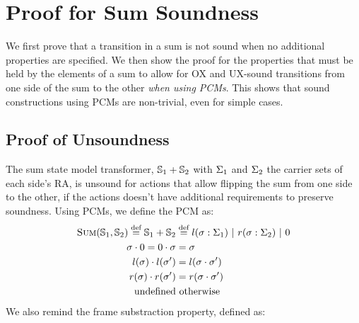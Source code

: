 \chapter{Proof for Sum Soundness} \label{ap:sum-soundness}

We first prove that a transition in a sum is not sound when no additional properties are specified. We then show the proof for the properties that must be held by the elements of a sum to allow for OX and UX-sound transitions from one side of the sum to the other \emph{when using PCMs}. This shows that sound constructions using PCMs are non-trivial, even for simple cases.

\section{Proof of Unsoundness}

The sum state model transformer, $\mathbb S_1 + \mathbb S_2$ with $\Sigma_1$ and $\Sigma_2$ the carrier sets of each side's RA, is unsound for actions that allow flipping the sum from one side to the other, if the actions doesn't have additional requirements to preserve soundness. Using PCMs, we define the \Sum{} PCM as: \begin{align*}
	\textsc{Sum}(\mathbb S_1, \mathbb S_2) \stackrel{\textnormal{def}}= \mathbb S_1 + \mathbb S_2 &\stackrel{\textnormal{def}}= l(\sigma: \Sigma_1) ~|~ r(\sigma: \Sigma_2) ~|~ 0 \\
	\sigma \cdot 0 = 0 \cdot \sigma &= \sigma\\
	l(\sigma) \cdot l(\sigma') &= l(\sigma\cdot\sigma')\\
	r(\sigma) \cdot r(\sigma') &= r(\sigma\cdot\sigma')\\
	\text{undefined}&\text{ otherwise}
\end{align*} We also remind the frame substraction property, defined as:

\newcommand{\swap}[0]{\code{swap}}
\newcommand{\execswap}[2]{\ppexecc{\swap}{#1}{#2}}

